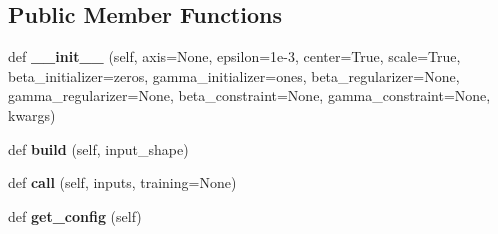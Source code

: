 \subsection*{Public Member Functions}
\begin{DoxyCompactItemize}
\item 
\mbox{\label{classmodels_1_1instance__normalization_1_1InstanceNormalization_a9c845a9db6e0fc2c60931dfecf98188a}} 
def {\bfseries \+\_\+\+\_\+init\+\_\+\+\_\+} (self, axis=None, epsilon=1e-\/3, center=\+True, scale=\+True, beta\+\_\+initializer=\textquotesingle{}zeros\textquotesingle{}, gamma\+\_\+initializer=\textquotesingle{}ones\textquotesingle{}, beta\+\_\+regularizer=\+None, gamma\+\_\+regularizer=\+None, beta\+\_\+constraint=\+None, gamma\+\_\+constraint=\+None, kwargs)
\item 
\mbox{\label{classmodels_1_1instance__normalization_1_1InstanceNormalization_ad958ae2ea5c242df851f4a82431efb17}} 
def {\bfseries build} (self, input\+\_\+shape)
\item 
\mbox{\label{classmodels_1_1instance__normalization_1_1InstanceNormalization_a894fa65d45fa8feffea2d93c603c25c8}} 
def {\bfseries call} (self, inputs, training=None)
\item 
\mbox{\label{classmodels_1_1instance__normalization_1_1InstanceNormalization_a7ccc3173cb607776327685c7a075ad6d}} 
def {\bfseries get\+\_\+config} (self)
\end{DoxyCompactItemize}
